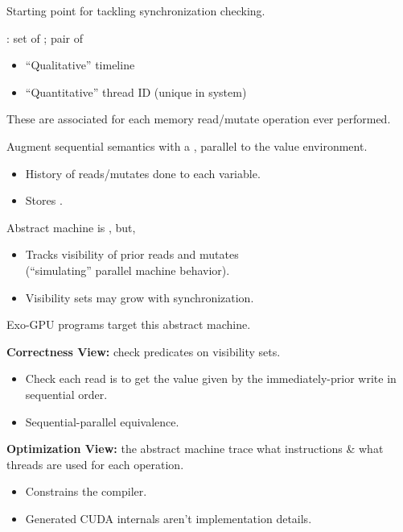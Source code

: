 {\LARGE
Starting point for tackling synchronization checking.

\vspace{5mm}

: set of ; pair of
\begin{itemize}
  \item ``Qualitative'' timeline
  \item ``Quantitative'' thread ID (unique in system)
\end{itemize}

\vspace{5mm}

These are associated for each memory read/mutate operation ever performed.

}


\newpage
{}

{\LARGE

Augment sequential semantics with a , parallel to the value environment.
\begin{itemize}
  \item History of reads/mutates done to each variable.
  \item Stores .
\end{itemize}

\vspace{5mm}

Abstract machine is , but,
\begin{itemize}
  \item Tracks visibility of prior reads and mutates\\(``simulating'' parallel machine behavior).
  \item Visibility sets may grow with synchronization.
\end{itemize}

}


\newpage
{}

{\LARGE
Exo-GPU programs target this abstract machine.

\textbf{Correctness View:} check predicates on visibility sets.
\begin{itemize}
  \item Check each read is  to get the value given by the immediately-prior write in sequential order.
  \item Sequential-parallel equivalence.
\end{itemize}

\textbf{Optimization View:} the abstract machine trace  what instructions \& what threads are used for each operation.
\begin{itemize}
  \item Constrains the compiler.
  \item Generated CUDA internals aren't implementation details.
\end{itemize}

}


